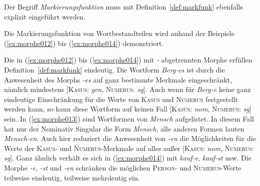 
Der Begriff \textit{Markierungsfunktion} muss mit Definition~\ref{def:markfunk} ebenfalls explizit eingeführt werden.


Die Markierungsfunktion von Wortbestandteilen wird anhand der Beispiele (\ref{ex:morphe012}) bis (\ref{ex:morphe014}) demonstriert.


\begin{exe}
  \ex \label{ex:morphe012}
  \begin{xlist}
  \end{xlist}
  \ex \label{ex:morphe013}
  \begin{xlist}
  \end{xlist}

  \ex \label{ex:morphe014}
  \begin{xlist}
  \end{xlist}
\end{exe}

Die in (\ref{ex:morphe012}) bis (\ref{ex:morphe014}) mit \textit{-} abgetrennten Morphe erfüllen Definition~\ref{def:markfunk} eindeutig.
Die Wortform \textit{Berg-es} ist durch die Anwesenheit des Morphs \textit{-es} auf ganz bestimmte Merkmale eingeschränkt, nämlich mindestens [\textsc{Kasus}: \textit{gen}, \textsc{Numerus}: \textit{sg}].
\label{abs:morphe015}Auch wenn für \textit{Berg-e} keine ganz eindeutige Einschränkung für die Werte von \textsc{Kasus} und \textsc{Numerus} festgestellt werden kann, so kann diese Wortform \zB auf keinen Fall [\textsc{Kasus}: \textit{nom}, \textsc{Numerus}: \textit{sg}] sein.
In (\ref{ex:morphe013}) sind Wortformen von \textit{Mensch} aufgelistet.
In diesem Fall hat nur der Nominativ Singular die Form \textit{Mensch}, alle anderen Formen lauten \textit{Mensch-en}.
Auch hier reduziert die Anwesenheit von \textit{-en} die Möglichkeiten für die Werte der \textsc{Kasus}- und \textsc{Numerus}-Merkmale auf alles außer [\textsc{Kasus}: \textit{nom}, \textsc{Numerus}: \textit{sg}].
Ganz ähnlich verhält es sich in (\ref{ex:morphe014}) mit \textit{kauf-e}, \textit{kauf-st} usw.
Die Morphe \textit{-e}, \textit{-st} und \textit{-en} schränken die möglichen \textsc{Person}- und \textsc{Numerus}-Werte teilweise eindeutig, teilweise mehrdeutig ein.


